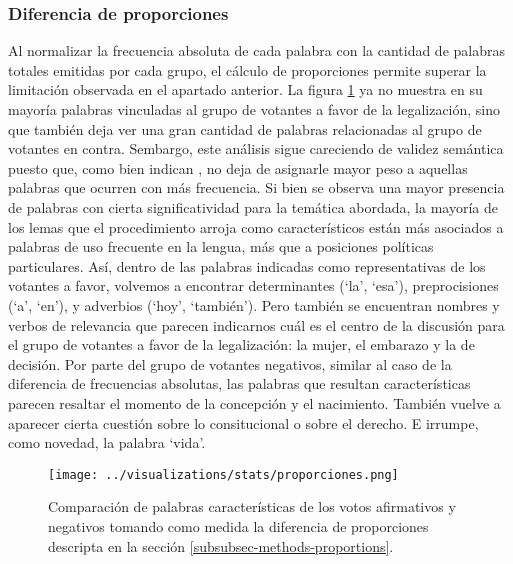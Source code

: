 \subsubsection{Diferencia de proporciones}
\label{subsubsec-results-proporcions}
Al normalizar la frecuencia absoluta de cada palabra con la cantidad
de palabras totales emitidas por cada grupo, el cálculo de proporciones permite
superar la limitación observada en el apartado anterior.
La figura \ref{fig-statistics-proportions} ya no muestra en su mayoría palabras
vinculadas al grupo de votantes a favor de la legalización, sino que también
deja ver una gran cantidad de palabras relacionadas al grupo de votantes en contra.
Sembargo, este análisis sigue careciendo de validez semántica puesto que, como bien
indican \cite{monroe2008fightin}, no deja de asignarle mayor peso a aquellas palabras
que ocurren con más frecuencia. Si bien se observa una mayor presencia de palabras
con cierta significatividad para la temática abordada, la mayoría de los lemas
que el procedimiento arroja como característicos están más asociados a palabras
de uso frecuente en la lengua, más que a posiciones políticas particulares. Así,
dentro de las palabras indicadas como representativas de los votantes a favor,
volvemos a encontrar determinantes (`la', `esa'), preprocisiones (`a', `en'),
y adverbios (`hoy', `también'). Pero también se encuentran nombres y verbos
de relevancia que parecen indicarnos cuál es el centro de la discusión para el
grupo de votantes a favor de la legalización: la mujer, el embarazo y la
de decisión. Por parte del grupo de votantes negativos, similar al caso de
la diferencia de frecuencias absolutas, las palabras que resultan
características parecen resaltar  el momento de la concepción y el nacimiento.
También vuelve a aparecer cierta cuestión sobre lo consitucional o sobre el derecho.
E irrumpe, como novedad, la palabra `vida'.

\begin{figure}[h!]
    \centering
    \texttt{[image: ../visualizations/stats/proporciones.png]}
    \caption{Comparación de palabras características de los votos afirmativos y
    negativos tomando como medida la diferencia de proporciones descripta
    en la sección \ref{subsubsec-methods-proportions}.}
    \label{fig-statistics-proportions}
\end{figure}

